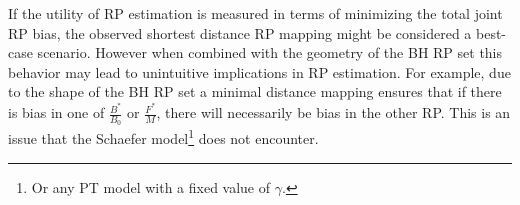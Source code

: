 

%
%
%
%

%
If the utility of RP estimation is measured in terms of minimizing the total 
joint RP bias, the observed shortest distance RP mapping might be considered 
a best-case scenario. %
However when combined with the geometry of the BH RP set this behavior may 
lead to unintuitive implications in RP estimation.
For example, due to the shape of the BH RP set a minimal distance mapping
ensures that if there is bias in one of $\frac{B^*}{B_0}$ or $\frac{F^*}{M}$, 
there will necessarily be bias in the other RP. This is an issue that the 
Schaefer model\footnote{Or any PT model with a fixed value of $\gamma$.} 
does not encounter.  

